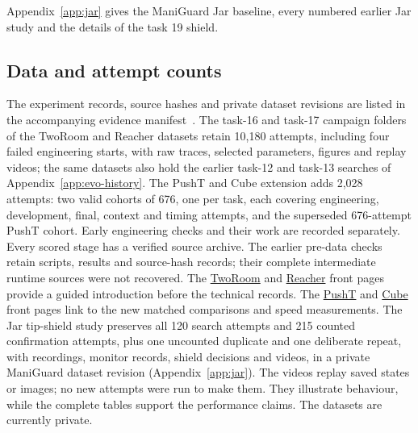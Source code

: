 \documentclass[sigconf,nonacm]{acmart}
\begin{document}
Appendix~\ref{app:jar} gives the ManiGuard Jar baseline, every numbered earlier Jar study and the details of the task 19 shield.

\subsection{Data and attempt counts}\label{app:data}
The experiment records, source hashes and private dataset revisions are
listed in the accompanying evidence manifest~\cite{mohan2026evidence}.
The task-16 and task-17 campaign folders of the TwoRoom and Reacher
datasets retain 10,180 attempts, including four failed engineering starts,
with raw traces, selected parameters, figures and replay videos; the same
datasets also hold the earlier task-12 and task-13 searches of
Appendix~\ref{app:evo-history}.
The PushT and Cube extension adds 2,028 attempts: two valid cohorts of 676,
one per task, each covering engineering, development, final, context and
timing attempts, and the superseded 676-attempt PushT cohort. Early engineering checks and
their work are recorded separately. Every scored stage has a verified source
archive. The earlier pre-data checks retain scripts, results and source-hash
records; their complete intermediate runtime sources were not recovered.
The \href{https://huggingface.co/datasets/Sachioster/SafetyDial-TwoRoom}{TwoRoom}
and \href{https://huggingface.co/datasets/Sachioster/SafetyDial-Reacher}{Reacher}
front pages provide a guided introduction before the technical records.
The \href{https://huggingface.co/datasets/Sachioster/SafetyDial-PushT}{PushT}
and \href{https://huggingface.co/datasets/Sachioster/SafetyDial-Cube}{Cube}
front pages link to the new matched comparisons and speed measurements.
The Jar tip-shield study preserves all 120 search attempts and 215 counted
confirmation attempts, plus one uncounted duplicate and one deliberate
repeat,
with recordings, monitor records, shield decisions and videos, in a private
ManiGuard dataset revision (Appendix~\ref{app:jar}).
The videos replay saved states or images; no new attempts were run to make
them. They illustrate behaviour, while the complete tables support the
performance claims. The datasets are currently private.





\end{document}

